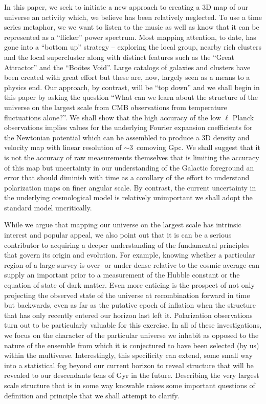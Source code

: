 \documentclass[useAMS,usenatbib,a4paper]{mn2e}
\begin{document}
In this paper, we seek to initiate a new approach to creating a 3D map of our universe an activity which, we believe has been relatively neglected. To use a time series metaphor, we we want to listen to the music as well as know that it can be represented as a ``flicker'' power spectrum. Most mapping attention, to date, has gone into a ``bottom up'' strategy -- exploring the local group, nearby rich clusters and the local supercluster along with distinct features such as the ``Great Attractor'' and the ``Bo\"otes Void''. Large catalogs of galaxies and clusters have been created with great effort but these are, now, largely seen as a means to a physics end. Our approach, by contrast, will be ``top down'' and we shall begin in this paper by asking the question ``What can we learn about the structure of the universe on the largest scale from CMB observations from temperature fluctuations alone?''. We shall show that the high accuracy of the low $\ell$ Planck observations implies values for the underlying Fourier expansion coefficients for the Newtonian potential which can be assembled to produce a 3D density and velocity map with linear resolution of $\sim3$~comoving Gpc. We shall suggest that it is not the accuracy of raw measurements themselves that is limiting the accuracy of this map but uncertainty in our understanding of the Galactic foreground an error that should diminish with time as a corollary of the effort to understand polarization maps on finer angular scale. By contrast, the current uncertainty in the underlying cosmological model is relatively unimportant we shall adopt the standard model uncritically. 

While we argue that mapping our universe on the largest scale has intrinsic interest and popular appeal, we also point out that it is can be a serious contributor to acquiring a deeper understanding of the fundamental principles that govern its origin and evolution. For example, knowing whether a particular region of a large survey is over- or under-dense relative to the cosmic average can supply an important prior to a measurement of the Hubble constant or the equation of state of dark matter. Even more enticing is the prospect of not only projecting the observed state of the universe at recombination forward in time but backwards, even as far as the putative epoch of inflation when the structure that has only recently entered our horizon last left it. Polarization observations turn out to be particularly valuable for this exercise. In all of these investigations, we focus on the character of the particular universe we inhabit as opposed to the nature of the ensemble from which it is conjectured to have been selected (by us) within the multiverse. Interestingly, this specificity can extend, some small way into a statistical fog beyond our current horizon to reveal structure that will be revealed to our descendants tens of Gyr in the future. Describing the very largest scale structure that is in some way knowable raises some important questions of definition and principle that we shall attempt to clarify. 
\end{document}
